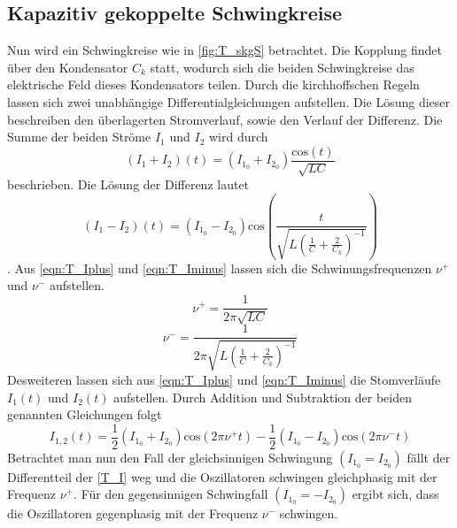 \subsection{Kapazitiv gekoppelte Schwingkreise}
\label{T_KgS}
Nun wird ein Schwingkreise wie in \autoref{fig:T_skgS} betrachtet. Die Kopplung findet über den Kondensator $C_k$ statt, wodurch sich die beiden Schwingkreise das elektrische Feld dieses Kondensators
teilen. Durch die kirchhoffschen Regeln lassen sich zwei unabhängige Differentialgleichungen aufstellen. Die Lösung dieser beschreiben den überlagerten Stromverlauf, sowie den Verlauf der Differenz.
Die Summe der beiden Ströme $I_1$ und $I_2$ wird durch 
\begin{equation}
    \label{eqn:T_Iplus}
    \left(I_1 + I_2\right)\left(t\right) = \left(I_{1_0} + I_{2_0}\right)\frac{\text{cos}\left(t\right)}{\sqrt{LC}}
\end{equation}
beschrieben. Die Lösung der Differenz lautet
\begin{equation}
    \label{eqn:T_Iminus}
    \left(I_1 - I_2\right)\left(t\right) = \left(I_{1_0} - I_{2_0}\right)\text{cos}\left(\frac{t}{\sqrt{L\left(\frac{1}{C}+\frac{2}{C_k}\right)^{-1}}}\right)
\end{equation}.
Aus \autoref{eqn:T_Iplus} und \autoref{eqn:T_Iminus} lassen sich die Schwinungsfrequenzen $\nu^+$ und $\nu^-$ aufstellen.
\begin{equation}
    \label{eqn:T_nup}
    \nu^+ = \frac{1}{2\pi\sqrt{LC}}
\end{equation}
\begin{equation}
    \label{T_num}
    \nu^- =  \frac{1}{2\pi\sqrt{L\left(\frac{1}{C}+\frac{2}{C_k}\right)^{-1}}}
\end{equation}
Desweiteren lassen sich aus \autoref{eqn:T_Iplus} und \autoref{eqn:T_Iminus} die Stomverläufe $I_1(t)$ und $I_2(t)$ aufstellen. Durch Addition und Subtraktion der beiden genannten Gleichungen 
folgt 
\begin{equation}
    \label{T_I}
    I_{1,2}(t) = \frac{1}{2}\left(I_{1_0} + I_{2_0}\right)\text{cos}\left(2\pi\nu^+ t\right) - \frac{1}{2}\left(I_{1_0} - I_{2_0}\right)\text{cos}\left(2\pi\nu^- t\right)
\end{equation}
Betrachtet man nun den Fall der gleichsinnigen Schwingung $\left(I_{1_0} = I_{2_0}\right)$ fällt der Differentteil der \autoref{T_I} weg und die Oszillatoren schwingen gleichphasig mit der Frequenz 
$\nu^+$.
Für den gegensinnigen Schwingfall $\left(I_{1_0} = -I_{2_0}\right)$ ergibt sich, dass die Oszillatoren gegenphasig mit der Frequenz $\nu^-$ schwingen.
